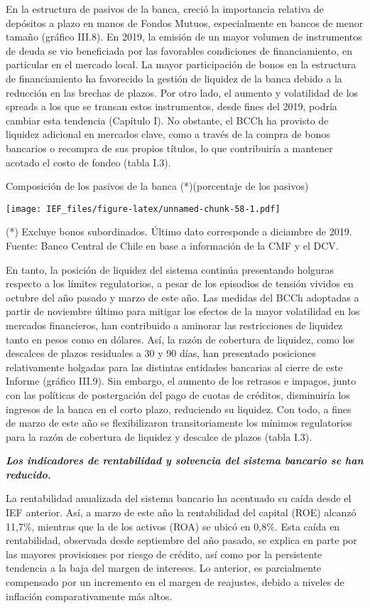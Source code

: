 \documentclass[
]{book}
\begin{document}
En la estructura de pasivos de la banca, creció la importancia relativa de
depósitos a plazo en manos de Fondos Mutuos, especialmente en bancos de
menor tamaño (gráfico III.8). En 2019, la emisión de un mayor volumen de
instrumentos de deuda se vio beneficiada por las favorables condiciones de
financiamiento, en particular en el mercado local. La mayor participación de
bonos en la estructura de financiamiento ha favorecido la gestión de liquidez
de la banca debido a la reducción en las brechas de plazos. Por otro lado, el
aumento y volatilidad de los spreads a los que se transan estos instrumentos,
desde fines del 2019, podría cambiar esta tendencia (Capítulo I). No obstante,
el BCCh ha provisto de liquidez adicional en mercados clave, como a través
de la compra de bonos bancarios o recompra de sus propios títulos, lo que
contribuiría a mantener acotado el costo de fondeo (tabla I.3).

Composición de los pasivos de la banca (*)(porcentaje de los pasivos)

\texttt{[image: IEF\_files/figure-latex/unnamed-chunk-58-1.pdf]}

(*) Excluye bonos subordinados. Último dato corresponde a diciambre de 2019.
Fuente: Banco Central de Chile en base a información de la CMF y el DCV.

En tanto, la posición de liquidez del sistema continúa presentando holguras
respecto a los límites regulatorios, a pesar de los episodios de tensión vividos en
octubre del año pasado y marzo de este año. Las medidas del BCCh adoptadas
a partir de noviembre último para mitigar los efectos de la mayor volatilidad
en los mercados financieros, han contribuido a aminorar las restricciones de
liquidez tanto en pesos como en dólares. Así, la razón de cobertura de liquidez,
como los descalces de plazos residuales a 30 y 90 días, han presentado
posiciones relativamente holgadas para las distintas entidades bancarias al
cierre de este Informe (gráfico III.9). Sin embargo, el aumento de los retrasos e
impagos, junto con las políticas de postergación del pago de cuotas de créditos,
disminuiría los ingresos de la banca en el corto plazo, reduciendo su liquidez.
Con todo, a fines de marzo de este año se flexibilizaron transitoriamente los
mínimos regulatorios para la razón de cobertura de liquidez y descalce de
plazos (tabla I.3).

\textbf{\emph{Los indicadores de rentabilidad y solvencia del sistema bancario se han reducido.}}

La rentabilidad anualizada del sistema bancario ha acentuado su caída desde
el IEF anterior. Así, a marzo de este año la rentabilidad del capital (ROE) alcanzó
11,7\%, mientras que la de los activos (ROA) se ubicó en 0,8\%. Esta caída en
rentabilidad, observada desde septiembre del año pasado, se explica en parte
por las mayores provisiones por riesgo de crédito, así como por la persistente
tendencia a la baja del margen de intereses. Lo anterior, es parcialmente
compensado por un incremento en el margen de reajustes, debido a niveles de
inflación comparativamente más altos.
\end{document}
